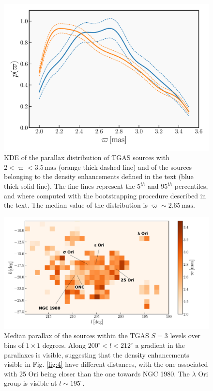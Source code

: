 \documentclass[twocolumn]{aa}
\begin{document}
\begin{figure}
\includegraphics[width = \hsize, keepaspectratio]{fig5def.pdf}
\caption{KDE of the parallax distribution of TGAS sources with $2 < \varpi < 3.5 \, \mathrm{mas}$ (orange thick dashed line) and of the sources belonging to the density enhancements defined in the text (blue thick solid line). The fine lines represent the $5^{th}$ and $95^{th}$ percentiles, and where computed with the bootstrapping procedure described in the text. The median value of the distribution is $\varpi \sim 2.65 \, \mathrm{mas}.$}
\label{fig:5}
\end{figure}

\begin{figure}
\includegraphics[width = \textwidth]{fig6b_labels+small.pdf}
\caption{
Median parallax of the sources within the TGAS $S = 3$ levels over bins of $1\times 1$ degrees. Along $200^{\circ} < l < 212^{\circ}$ a gradient in the parallaxes is visible, suggesting that the density enhancements visible in Fig. \ref{fig:4} have different distances, with the one associated with 25 Ori being closer than the one towards  NGC 1980. The $\lambda$ Ori group is visible at $l \sim 195^{\circ}$.
}
\label{fig:13}
\end{figure}
\end{document}
